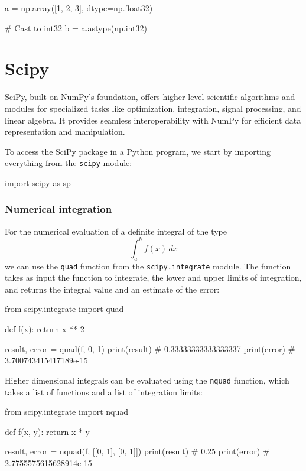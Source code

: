 \begin{codeblock}[language=python]
a = np.array([1, 2, 3], dtype=np.float32)

# Cast to int32
b = a.astype(np.int32)
\end{codeblock}



\section{Scipy}

SciPy, built on NumPy's foundation, offers higher-level scientific algorithms and modules for
specialized tasks like optimization, integration, signal processing, and linear algebra. It provides
seamless interoperability with NumPy for efficient data representation and manipulation.

To access the SciPy package in a Python program, we start by importing everything from the
\texttt{scipy} module:
\begin{codeblock}[language=python]
import scipy as sp
\end{codeblock}

\subsubsection*{Numerical integration}

For the numerical evaluation of a definite integral of the type 
\[
\int_{a}^{b} f(x) \, dx
\]
we can use the \texttt{quad} function from the \texttt{scipy.integrate} module. The function takes as input the
function to integrate, the lower and upper limits of integration, and returns the integral value and an estimate of the error:

\begin{codeblock}[language=python]
from scipy.integrate import quad

def f(x):
    return x ** 2

result, error = quad(f, 0, 1)
print(result)  # 0.33333333333333337
print(error)  # 3.700743415417189e-15
\end{codeblock}

Higher dimensional integrals can be evaluated using the \texttt{nquad} function, which takes a list of functions and a list of integration limits:

\begin{codeblock}[language=python]
from scipy.integrate import nquad

def f(x, y):
    return x * y

result, error = nquad(f, [[0, 1], [0, 1]])
print(result)  # 0.25
print(error)  # 2.7755575615628914e-15
\end{codeblock}

